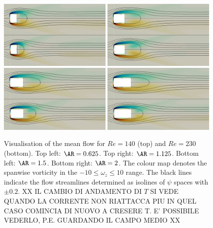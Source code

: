 \begin{figure}
  \centering
  \includegraphics[width=0.49\textwidth]{./fig/AR1s/AR0p75_Re140_Re230_omegaz_Av.png}
  \includegraphics[width=0.49\textwidth]{./fig/AR1s/AR1p25_Re140_Re230_omegaz_Av.png}
  \includegraphics[width=0.49\textwidth]{./fig/AR1s/AR1p5_Re140_Re230_omegaz_Av.png}
  \includegraphics[width=0.49\textwidth]{./fig/AR1s/AR2_Re140_Re230_omegaz_Av.png}
  \caption{Visualisation of the mean flow for $Re=140$ (top) and $Re=230$ (bottom). Top left: $\AR=0.625$. Top right: $\AR=1.125$. Bottom left: $\AR=1.5$. Bottom right: $\AR=2$. The colour map denotes the spanwise vorticity in the $-10 \le \omega_z \le 10$ range. The black lines indicate the flow streamlines determined as isolines of $\psi$ spaces with $\pm 0.2$. XX IL CAMBIO DI ANDAMENTO DI $T$ SI VEDE QUANDO LA CORRENTE NON RIATTACCA PIU IN QUEL CASO COMINCIA DI NUOVO A CRESERE T. E' POSSIBILE VEDERLO, P.E. GUARDANDO IL CAMPO MEDIO XX}
  \label{fig:Av_Re140_Re230}
\end{figure} 

